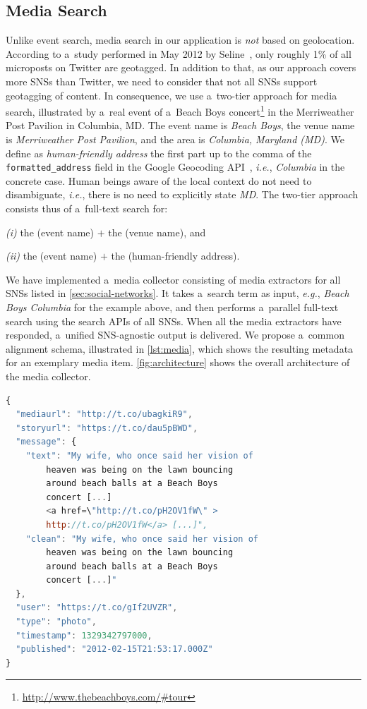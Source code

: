 \documentclass{acm_proc_article-sp}
\let\oldemph\emph
\renewcommand{\emph}[1]{\oldemph{\fontsize{9}{9}\selectfont #1}}
\begin{document}
\subsection{Media Search} \label{sec:media-search}
Unlike event search, media search in our application is \emph{not} based on geolocation.
According to a~study performed in May 2012 by Seline~\cite{Quora2012},
only roughly 1\% of all microposts on Twitter are geotagged.
In addition to that, as our approach covers more SNSs than Twitter,
we need to consider that not all SNSs support geotagging of content.
In consequence, we use a~two-tier approach for media search,
illustrated by a~real event of a~Beach Boys
concert\footnote{\url{http://www.thebeachboys.com/\#tour}}
in the Merriweather Post Pavilion in Columbia, MD.
The event name is \emph{Beach Boys},
the venue name is \emph{Merriweather Post Pavilion},
and the area is \emph{Columbia, Maryland (MD)}.
We define as \emph{human-friendly address}
the first part up to the comma of the \texttt{formatted\_address} field
in the Google Geocoding API~\cite{Geocoding2012},
\emph{i.e.}, \emph{Columbia} in the concrete case.
Human beings aware of the local context do not need to disambiguate, \emph{i.e.},
there is no need to explicitly state \emph{MD}.
The two-tier approach consists thus of a~full-text search for:

\emph{(i)} the (event name) $+$ the (venue name), and

\emph{(ii)} the (event name) $+$ the (human-friendly address).

We have implemented a~media collector consisting of media extractors for all SNSs
listed in \autoref{sec:social-networks}.
It takes a~search term as input, \emph{e.g.},
\emph{Beach Boys Columbia} for the example above,
and then performs a~parallel full-text search using the search APIs of all SNSs.
When all the media extractors have responded, a~unified SNS-agnostic output is delivered.
We propose a~common alignment schema, illustrated in
\autoref{lst:media}, which shows the resulting metadata for an exemplary media item.
\autoref{fig:architecture} shows the overall architecture of the media collector.

\begin{lstlisting}[language=JavaScript,caption={Sample output of the media collector showing a~\mbox{Google+} post (edited for legibility, URLs shortened).},label={lst:media}]
{
  "mediaurl": "http://t.co/ubagkiR9",
  "storyurl": "https://t.co/dau5pBWD",
  "message": {
    "text": "My wife, who once said her vision of
        heaven was being on the lawn bouncing
        around beach balls at a Beach Boys
        concert [...]
        <a href=\"http://t.co/pH2OV1fW\" >
        http://t.co/pH2OV1fW</a> [...]",
    "clean": "My wife, who once said her vision of
        heaven was being on the lawn bouncing
        around beach balls at a Beach Boys
        concert [...]"
  },
  "user": "https://t.co/gIf2UVZR",
  "type": "photo",
  "timestamp": 1329342797000,
  "published": "2012-02-15T21:53:17.000Z"
}
\end{lstlisting}
\end{document}
